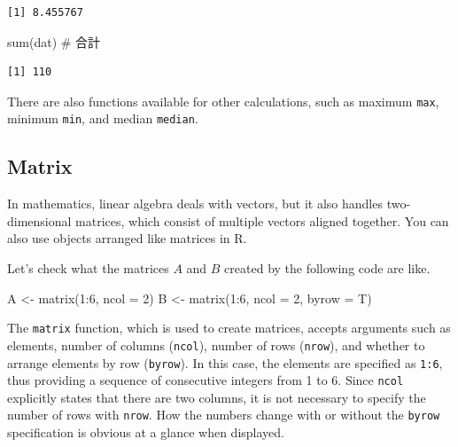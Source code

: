 \documentclass[
  a4paper,
]{book}
\newenvironment{Shaded}{\begin{snugshade}}{\end{snugshade}}
\newcommand{\AttributeTok}[1]{\textcolor[rgb]{0.40,0.45,0.13}{#1}}
\newcommand{\CommentTok}[1]{\textcolor[rgb]{0.37,0.37,0.37}{#1}}
\newcommand{\DecValTok}[1]{\textcolor[rgb]{0.68,0.00,0.00}{#1}}
\newcommand{\FunctionTok}[1]{\textcolor[rgb]{0.28,0.35,0.67}{#1}}
\newcommand{\NormalTok}[1]{\textcolor[rgb]{0.00,0.23,0.31}{#1}}
\newcommand{\OtherTok}[1]{\textcolor[rgb]{0.00,0.23,0.31}{#1}}
\newcommand{\SpecialCharTok}[1]{\textcolor[rgb]{0.37,0.37,0.37}{#1}}
\begin{document}
\begin{verbatim}
[1] 8.455767
\end{verbatim}

\begin{Shaded}
\begin{Highlighting}[]
\FunctionTok{sum}\NormalTok{(dat) }\CommentTok{\# 合計}
\end{Highlighting}
\end{Shaded}

\begin{verbatim}
[1] 110
\end{verbatim}

There are also functions available for other calculations, such as
maximum \texttt{max}, minimum \texttt{min}, and median \texttt{median}.

\subsection{Matrix}\label{matrix}

In mathematics, linear algebra deals with vectors, but it also handles
two-dimensional matrices, which consist of multiple vectors aligned
together. You can also use objects arranged like matrices in R.

Let's check what the matrices \(A\) and \(B\) created by the following
code are like.

\begin{Shaded}
\begin{Highlighting}[]
\NormalTok{A }\OtherTok{\textless{}{-}} \FunctionTok{matrix}\NormalTok{(}\DecValTok{1}\SpecialCharTok{:}\DecValTok{6}\NormalTok{, }\AttributeTok{ncol =} \DecValTok{2}\NormalTok{)}
\NormalTok{B }\OtherTok{\textless{}{-}} \FunctionTok{matrix}\NormalTok{(}\DecValTok{1}\SpecialCharTok{:}\DecValTok{6}\NormalTok{, }\AttributeTok{ncol =} \DecValTok{2}\NormalTok{, }\AttributeTok{byrow =}\NormalTok{ T)}
\end{Highlighting}
\end{Shaded}

The \texttt{matrix} function, which is used to create matrices, accepts
arguments such as elements, number of columns (\texttt{ncol}), number of
rows (\texttt{nrow}), and whether to arrange elements by row
(\texttt{byrow}). In this case, the elements are specified as
\texttt{1:6}, thus providing a sequence of consecutive integers from 1
to 6. Since \texttt{ncol} explicitly states that there are two columns,
it is not necessary to specify the number of rows with \texttt{nrow}.
How the numbers change with or without the \texttt{byrow} specification
is obvious at a glance when displayed.
\end{document}

